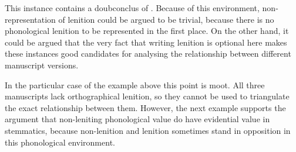 
\begin{mwl}
\end{mwl}

This instance contains a \gls{doubconclus} of . Because of this environment, non-representation of lenition could be argued to be trivial, because there is no phonological lenition to be represented in the first place. On the other hand, it could be argued that the very fact that writing lenition is optional here makes these instances good candidates for analysing the relationship between different manuscript versions.

In the particular case of the example above this point is moot. All three manuscripts lack orthographical lenition, so they cannot be used to triangulate the exact relationship between them. However, the next example supports the argument that non-leniting phonological value do have evidential value in stemmatics, because non-lenition and lenition sometimes stand in opposition in this phonological environment.

\begin{mwl}
\end{mwl}

